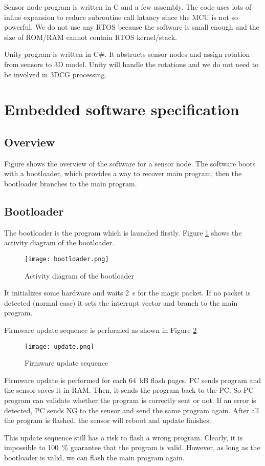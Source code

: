 \documentclass[journal]{IEEEtran}
\begin{document}
Sensor node program is written in C and a few assembly.
The code uses lots of inline expansion to reduce subroutine call latancy since the MCU is not so powerful.
We do not use any RTOS because the software is small enough and the size of ROM/RAM cannot contain RTOS kernel/stack.

Unity program is written in C\#.
It abstructs sensor nodes and assign rotation from sensors to 3D model.
Unity will handle the rotations and we do not need to be involved in 3DCG processing.

\section{Embedded software specification}
\subsection{Overview}
Figure  shows the overview of the software for a sensor node.
The software boots with a bootloader, which provides a way to recover main program, then the bootloader branches to the main program.

\subsection{Bootloader}
The bootloader is the program which is launched firstly.
Figure \ref{boot-act} shows the activity diagram of the bootloader.
\begin{figure}[tb]
    \centering
    \texttt{[image: bootloader.png]}
    \caption{Activity diagram of the bootloader} \label{boot-act}
\end{figure}
It initializes some hardware and waits \SI{2}{\s} for the magic packet.
If no packet is detected (normal case) it sets the interrupt vector and branch to the main program.

Firmware update sequence is performed as shown in Figure \ref{boot-upd}
\begin{figure}[tb]
    \centering
    \texttt{[image: update.png]}
    \caption{Firmware update sequence} \label{boot-upd}
\end{figure}
Firmware update is performed for each \SI{64}{kB} flash pages.
PC sends program and the sensor saves it in RAM.
Then, it sends the program back to the PC.
So PC program can validate whether the program is correctly sent or not.
If an error is detected, PC sends NG to the sensor and send the same program again.
After all the program is flashed, the sensor will reboot and update finishes.

This update sequence still has a risk to flash a wrong program.
Clearly, it is impossible to \SI{100}{\percent} guarantee that the program is valid.
However, as long as the bootloader is valid, we can flash the main program again.
\end{document}
